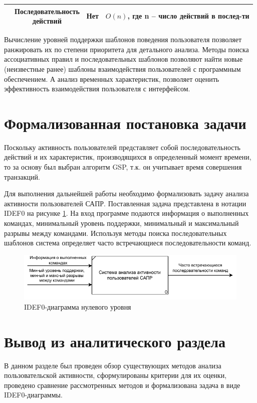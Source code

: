 \begin{table}[H]
\begin{center}
\begin{tabular}{ | c | c | c | c | }
			\specialcell{GOMS} & \specialcell{Последовательность\\действий} & Нет & \specialcell{$O(n)$, где n --\\число действий\\в послед-ти} \\ \hline
		\end{tabular}
	\end{center}
\end{table}

Вычисление уровней поддержки шаблонов поведения пользователя позволяет ранжировать их по степени приоритета для детального анализа.
Методы поиска ассоциативных правил и последовательных шаблонов позволяют найти новые (неизвестные ранее) шаблоны взаимодействия пользователей с программным обеспечением.
А анализ временных характеристик, позволяет оценить эффективность взаимодействия пользователя с интерфейсом.

\section{Формализованная постановка задачи}
Поскольку активность пользователей представляет собой последовательность действий и их характеристик, производящихся в определенный момент времени, то за основу был выбран алгоритм GSP, т.к. он учитывает время совершения транзакций.

Для выполнения дальнейшей работы необходимо формализовать задачу анализа активности пользователей САПР. Поставленная задача представлена в нотации IDEF0 на рисунке \ref{idef0}. На вход программе подаются информация о выполненных командах, минимальный уровень поддержки, минимальный и максимальный разрывы между командами. Используя методы поиска последовательных шаблонов система определяет часто встречающиеся последовательности команд.

\begin{figure}[h!]
	\centering
	\includegraphics[width=1.0\textwidth]{inc/img/IDEF0.drawio.pdf}
	\caption{IDEF0-диаграмма нулевого уровня}
	\label{idef0}
\end{figure}

\section*{Вывод из аналитического раздела}

В данном разделе был проведен обзор существующих методов анализа пользовательской активности, сформулированы критерии для их оценки, проведено сравнение рассмотренных методов и формализована задача в виде IDEF0-диаграммы.